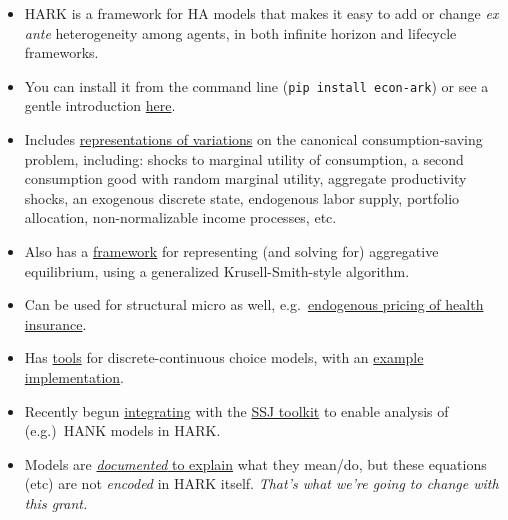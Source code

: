 \documentclass[12pt,pdftex,letterpaper]{article}
\begin{document}
\begin{itemize} 
	\item HARK is a framework for HA models that makes it easy to add or change \textit{ex ante} heterogeneity among agents, in both infinite horizon and lifecycle frameworks.
	
	\item You can install it from the command line (\texttt{pip install econ-ark}) or see a gentle introduction \href{https://econ-ark.org/materials/gentle-intro-to-hark/}{here}.
	
	\item Includes \href{https://docs.econ-ark.org/Documentation/reference/index.html}{representations of variations} on the canonical consumption-saving problem, including: shocks to marginal utility of consumption, a second consumption good with random marginal utility, aggregate productivity shocks, an exogenous discrete state, endogenous labor supply, portfolio allocation, non-normalizable income processes, etc.
	
	\item Also has a \href{https://docs.econ-ark.org/Documentation/reference/tools/core.html#HARK.core.Market}{framework} for representing (and solving for) aggregative equilibrium, using a generalized Krusell-Smith-style algorithm.
	
	\item Can be used for structural micro as well, e.g.\ \href{http://www.mnwhite.org/DynInsSelPaper.pdf}{endogenous pricing of health insurance}.
	
	\item Has \href{https://github.com/econ-ark/HARK/blob/master/HARK/dcegm.py}{tools} for discrete-continuous choice models, with an \href{https://econ-ark.org/materials/endogenousretirement/}{example implementation}.
	
	\item Recently begun \href{https://docs.econ-ark.org/examples/ConsNewKeynesianModel/SSJ_example.html}{integrating} with the \href{https://github.com/shade-econ/sequence-jacobian}{SSJ toolkit} to enable analysis of (e.g.)\ HANK models in HARK.
	
	\item Models are \href{https://docs.econ-ark.org/Documentation/reference/ConsumptionSaving/ConsRiskyAssetModel.html#HARK.ConsumptionSaving.ConsRiskyAssetModel.IndShockRiskyAssetConsumerType}{\textit{documented} to explain} what they mean/do, but these equations (etc) are not \textit{encoded} in HARK itself. \emph{That's what we're going to change with this grant.}
\end{itemize}
\end{document}
